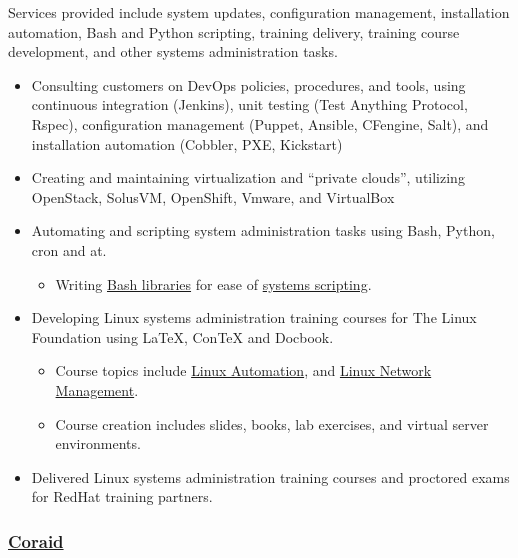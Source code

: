 \documentclass[fontsize=11pt]{scrartcl}
\begin{document}
Services provided include system updates, configuration management,
installation automation, Bash and Python scripting, training delivery,
training course development, and other systems administration tasks.

\begin{itemize}
\item
  Consulting customers on DevOps policies, procedures, and tools, using
  continuous integration (Jenkins), unit testing (Test Anything
  Protocol, Rspec), configuration management (Puppet, Ansible, CFengine,
  Salt), and installation automation (Cobbler, PXE, Kickstart)
\item
  Creating and maintaining virtualization and ``private clouds'',
  utilizing OpenStack, SolusVM, OpenShift, Vmware, and VirtualBox
\item
  Automating and scripting system administration tasks using Bash,
  Python, cron and at.

  \begin{itemize}
  \itemsep1pt\parskip0pt
  \item
    Writing \href{https://github.com/goozbach/log4bats}{Bash libraries}
    for ease of \href{https://github.com/goozbach/bash-app}{systems
    scripting}.
  \end{itemize}
\item
  Developing Linux systems administration training courses for The Linux
  Foundation using LaTeX, ConTeX and Docbook.

  \begin{itemize}
  \item
    Course topics include
    \href{http://training.linuxfoundation.org/linux-courses/system-administration-training/linux-enterprise-automation}{Linux
    Automation}, and
    \href{http://training.linuxfoundation.org/linux-courses/system-administration-training/linux-network-management}{Linux
    Network Management}.
  \item
    Course creation includes slides, books, lab exercises, and virtual
    server environments.
  \end{itemize}
\item
  Delivered Linux systems administration training courses and proctored
  exams for RedHat training partners.
\end{itemize}

\subsubsection{\href{http://www.coraid.com/}{Coraid}}\label{coraid}
\end{document}
